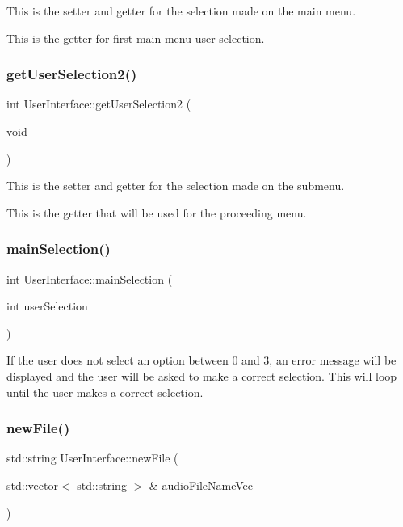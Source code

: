 This is the setter and getter for the selection made on the main menu.

This is the getter for first main menu user selection. \mbox{\label{classUserInterface_abb90cb9da4b550fa8c0d894f5b433f7f}} 
\subsubsection{\texorpdfstring{get\+User\+Selection2()}{getUserSelection2()}}
{\footnotesize\ttfamily int User\+Interface\+::get\+User\+Selection2 (\begin{DoxyParamCaption}\item[{void}]{ }\end{DoxyParamCaption})}

This is the setter and getter for the selection made on the submenu.

This is the getter that will be used for the proceeding menu. \mbox{\label{classUserInterface_a1d21e648944c255f3879133b26a9c454}} 
\subsubsection{\texorpdfstring{main\+Selection()}{mainSelection()}}
{\footnotesize\ttfamily int User\+Interface\+::main\+Selection (\begin{DoxyParamCaption}\item[{int}]{user\+Selection }\end{DoxyParamCaption})}

If the user does not select an option between 0 and 3, an error message will be displayed and the user will be asked to make a correct selection. This will loop until the user makes a correct selection. \mbox{\label{classUserInterface_a270f8ab101d5d94d556cdea6a7ae9a62}} 
\subsubsection{\texorpdfstring{new\+File()}{newFile()}}
{\footnotesize\ttfamily std\+::string User\+Interface\+::new\+File (\begin{DoxyParamCaption}\item[{std\+::vector$<$ std\+::string $>$ \&}]{audio\+File\+Name\+Vec }\end{DoxyParamCaption})}

